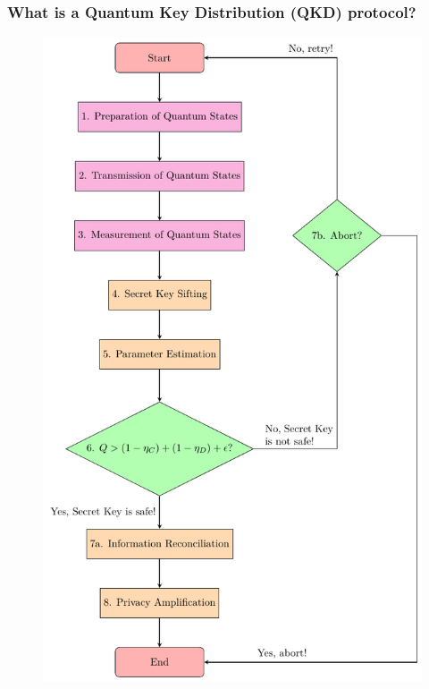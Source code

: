 \documentclass{beamer}
\begin{document}
		\begin{frame}
			\frametitle{\large What is a Quantum Key Distribution (QKD) protocol?}

            \vspace{4ex}
            \begin{figure}
                \centering
                \begin{minipage}{0.4\textwidth}
                    \centering
                    \includegraphics[width=1.0\linewidth, height=0.75\textheight]{figures/presentation/pdf/qkd-protocol-flowchart.pdf}
                    \vspace{-4ex}

\end{minipage}
\end{figure}
\end{frame}
\end{document}
